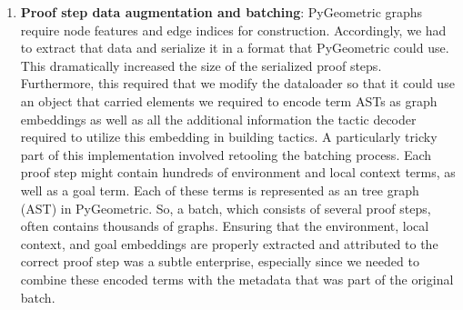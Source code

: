 \documentclass{article}
\begin{document}

\begin{enumerate}

    \item \textbf{Proof step data augmentation and batching}: PyGeometric graphs require node features and edge indices for construction. Accordingly, we had to extract that data and serialize it in a format that PyGeometric could use. This dramatically increased the size of the serialized proof steps. Furthermore, this required that we modify the dataloader so that it could use an object that carried elements we required to encode term ASTs as graph embeddings as well as all the additional information the tactic decoder required to utilize this embedding in building tactics. A particularly tricky part of this implementation involved retooling the batching process. Each proof step might contain hundreds of environment and local context terms, as well as a goal term. Each of these terms is represented as an tree graph (AST) in PyGeometric. So, a batch, which consists of several proof steps, often contains thousands of graphs. Ensuring that the environment, local context, and goal embeddings are properly extracted and attributed to the correct proof step was a subtle enterprise, especially since we needed to combine these encoded terms with the metadata that was part of the original batch.


\end{enumerate}
\end{document}

